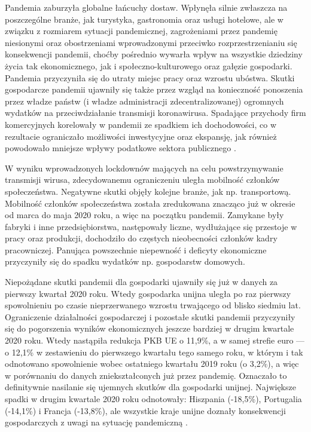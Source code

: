 \documentclass[polish, twoside, 12pt, a4paper]{article}
\theoremstyle{definition}
\theoremstyle{plain}
\theoremstyle{remark}
\begin{document}
Pandemia zaburzyła globalne łańcuchy dostaw. Wpłynęła silnie zwłaszcza na poszczególne branże, jak turystyka, gastronomia oraz usługi hotelowe, ale w związku z rozmiarem sytuacji pandemicznej, zagrożeniami przez pandemię niesionymi oraz obostrzeniami wprowadzonymi przeciwko rozprzestrzenianiu się konsekwencji pandemii, choćby pośrednio wywarła wpływ na wszystkie dziedziny życia tak ekonomicznego, jak i społeczno-kulturowego oraz gałęzie gospodarki. Pandemia przyczyniła się do utraty miejsc pracy oraz wzrostu ubóstwa. Skutki gospodarcze pandemii ujawniły się także przez wzgląd na konieczność ponoszenia przez władze państw (i władze administracji zdecentralizowanej) ogromnych wydatków na przeciwdziałanie transmisji koronawirusa. Spadające przychody firm komercyjnych korelowały w pandemii ze spadkiem ich dochodowości, co w rezultacie ograniczało możliwości inwestycyjne oraz ekspansję, jak również powodowało mniejsze wpływy podatkowe sektora publicznego \parencite{dziembala2021}.  

W wyniku wprowadzonych lockdownów mających na celu powstrzymywanie transmisji wirusa, zdecydowanemu ograniczeniu uległa mobilność członków społeczeństwa. Negatywne skutki objęły kolejne branże, jak np. transportową. Mobilność członków społeczeństwa została zredukowana znacząco już w okresie od marca do maja 2020 roku, a więc na początku pandemii. Zamykane były fabryki i inne przedsiębiorstwa, następowały liczne, wydłużające się przestoje w pracy oraz produkcji, dochodziło do częstych nieobecności członków kadry pracowniczej. Panująca powszechnie niepewność i deficyty ekonomiczne przyczyniły się do spadku wydatków np. gospodarstw domowych. 

Niepożądane skutki pandemii dla gospodarki ujawniły się już w danych za pierwszy kwartał 2020 roku. Wtedy gospodarka unijna uległa po raz pierwszy spowolnieniu po czasie nieprzerwanego wzrostu trwającego od blisko siedmiu lat. Ograniczenie działalności gospodarczej i pozostałe skutki pandemii przyczyniły się do pogorszenia wyników ekonomicznych jeszcze bardziej w drugim kwartale 2020 roku. Wtedy nastąpiła redukcja PKB UE o 11,9\%, a w samej strefie euro --- o 12,1\% w zestawieniu do pierwszego kwartału tego samego roku, w którym i tak odnotowano spowolnienie wobec ostatniego kwartału 2019 roku (o 3,2\%), a więc w porównaniu do danych zniekształconych już przez pandemię. Oznaczało to definitywnie nasilanie się ujemnych skutków dla gospodarki unijnej. Największe spadki w drugim kwartale 2020 roku odnotowały: Hiszpania (-18,5\%), Portugalia (-14,1\%) i Francja (-13,8\%), ale wszystkie kraje unijne doznały konsekwencji gospodarczych z uwagi na sytuację pandemiczną \parencite{dziembala2021}. 
\end{document}
